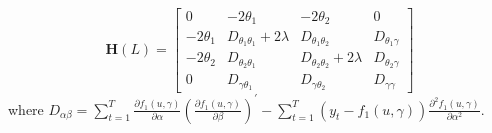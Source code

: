 \documentclass[a4paper,12pt,times,numbered,print,index]{report}
\numberwithin{equation}{section}
\begin{document}
	\begin{equation*}
		\mathbf{H}(L)=
		\left[\begin{array}{cccc}
			0 & -2\theta_1 & -2\theta_2 & 0 \\
			-2\theta_1 & D_{\theta_1\theta_1} + 2\lambda & D_{\theta_1\theta_2} & D_{\theta_1\gamma}\\ -2\theta_2 & D_{\theta_2\theta_1} & D_{\theta_2\theta_2} + 2\lambda & D_{\theta_2\gamma}\\
			0 & D_{\gamma\theta_1}  & D_{\gamma\theta_2} & D_{\gamma\gamma}
		\end{array}\right]
	\end{equation*}
	where 
	$D_{\alpha\beta} = \sum_{t=1}^{T} \frac{\partial f_{1}\left( u,\gamma\right)}{\partial \alpha} \left( \frac {\partial f_{1}\left( u,\gamma\right)}{\partial \beta}\right) ^{\prime} - \sum_{t=1}^{T}\left( y_t - f_{1}\left( u,\gamma\right)\right)  \frac{\partial^{2} f_{1}\left( u,\gamma\right)}{\partial \alpha^2}.$
	
	
\end{document}
